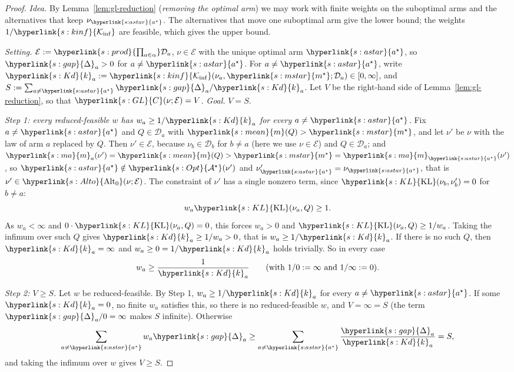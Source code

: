 \documentclass[11pt]{article}
\newcommand{\dt}[1]{\hypertarget{#1}{}}
\newcommand{\sy}[2]{{\hyperlink{#1}{#2}}}
\newcommand{\mean}{\sy{s:mean}{m}}
\newcommand{\KL}{\sy{s:KL}{\mathrm{KL}}}
\newcommand{\Kinf}{\sy{s:kinf}{\mathcal{K}_{\inf}}}
\newcommand{\marm}{\sy{s:ma}{m}}
\newcommand{\ms}{\sy{s:mstar}{m^{\star}}}
\newcommand{\gap}{\sy{s:gap}{\Delta}}
\newcommand{\Opt}{\sy{s:Opt}{\mathcal{A}^{\star}}}
\newcommand{\prodc}[1]{\sy{s:prod}{\textstyle\prod_{a\in\alpha}}#1_{a}}
\newcommand{\as}{\sy{s:astar}{a^{\star}}}
\newcommand{\Alto}{\sy{s:Alto}{\mathrm{Alt}_{0}}}
\newcommand{\GL}{\sy{s:GL}{C}}
\newcommand{\Kd}{\sy{s:Kd}{k}}
\begin{document}
\begin{proof}
\emph{Idea.} By Lemma~\ref{lem:gl-reduction} (\emph{removing the optimal arm}) we may work with
finite weights on the suboptimal arms and the alternatives that keep $\nu_{\as}$. The alternatives
that move one suboptimal arm give the lower bound; the weights $1/\Kinf$ are feasible, which gives
the upper bound.

\emph{Setting.} $\mathcal E:=\prodc{\mathcal D}$, $\nu\in\mathcal E$ with the unique optimal arm
$\as$, so $\gap_a>0$ for $a\ne\as$. \dt{s:Kd}For $a\ne\as$, write $\Kd_a:=\Kinf(\nu_a,\ms;\mathcal D_a)\in[0,\infty]$, and
$S:=\sum_{a\ne\as}\gap_a/\Kd_a$. Let $V$ be the right-hand side of Lemma~\ref{lem:gl-reduction}, so
that $\GL(\nu;\mathcal E)=V$. \emph{Goal.} $V=S$.

\emph{Step 1: every reduced-feasible $w$ has $w_a\ge1/\Kd_a$ for every $a\ne\as$.} Fix $a\ne\as$ and
$Q\in\mathcal D_a$ with $\mean(Q)>\ms$, and let $\nu'$ be $\nu$ with the law of arm $a$ replaced by $Q$.
Then $\nu'\in\mathcal E$, because $\nu_b\in\mathcal D_b$ for $b\ne a$ (here we use $\nu\in\mathcal E$)
and $Q\in\mathcal D_a$; and $\marm_a(\nu')=\mean(Q)>\ms=\marm_{\as}(\nu')$, so $\as\notin\Opt(\nu')$
and $\nu'_{\as}=\nu_{\as}$, that is $\nu'\in\Alto(\nu;\mathcal E)$. The constraint of $\nu'$ has a
single nonzero term, since $\KL(\nu_b,\nu'_b)=0$ for $b\ne a$:
\begin{equation*}
  w_a\KL(\nu_a,Q)\ge1.
\end{equation*}
As $w_a<\infty$ and $0\cdot\KL(\nu_a,Q)=0$, this forces $w_a>0$ and $\KL(\nu_a,Q)\ge1/w_a$. Taking
the infimum over such $Q$ gives $\Kd_a\ge1/w_a>0$, that is $w_a\ge1/\Kd_a$. If there is no such $Q$,
then $\Kd_a=\infty$ and $w_a\ge0=1/\Kd_a$ holds trivially. So in every case
\begin{equation*}
  w_a\ge\frac{1}{\Kd_a}\qquad\text{(with }1/0:=\infty\text{ and }1/\infty:=0\text{)}.
\end{equation*}

\emph{Step 2: $V\ge S$.} Let $w$ be reduced-feasible. By Step 1, $w_a\ge1/\Kd_a$ for every $a\ne\as$.
If some $\Kd_a=0$, no finite $w_a$ satisfies this, so there is
no reduced-feasible $w$, and $V=\infty=S$ (the term $\gap_a/0=\infty$ makes $S$ infinite). Otherwise
\begin{equation*}
  \sum_{a\ne\as}w_a\gap_a\ge\sum_{a\ne\as}\frac{\gap_a}{\Kd_a}=S,
\end{equation*}
and taking the infimum over $w$ gives $V\ge S$.


\end{proof}
\end{document}
